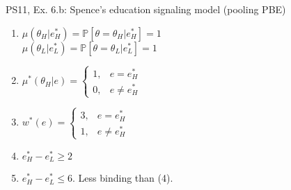 \begin{frame}{PS11, Ex. 6.b: Spence’s education signaling model (pooling PBE)}
\begin{multicols}{2}
\begin{enumerate}
        \item \vspace{-2pt}$\mu\left(\theta_H|e_H^*\right)=
               \mathbb{P}\left[\theta=\theta_H|e_H^*\right]=1$\\
              $\mu\left(\theta_L|e_L^*\right)=
               \mathbb{P}\left[\theta=\theta_L|e_L^*\right]=1$
        \item \vspace{-2pt}$\mu^*(\theta_H|e)=\left\{\begin{array}{ll}
                  1, & e = e_H^* \\
                  0, & e \neq e_H^*
               \end{array}\right.$
        \item \vspace{-2pt}$w^*(e)=\left\{\begin{array}{ll}
                  3, & e = e_H^* \\
                  1, & e \neq e_H^*
               \end{array}\right.$
        \item \vspace{-2pt}$e_H^*-e_L^*\geq2$
        \item \vspace{-2pt}$e_H^*-e_L^*\leq6$. Less binding than (4).
      \end{enumerate}
    \end{multicols}
    \vfill\null
\end{frame}
